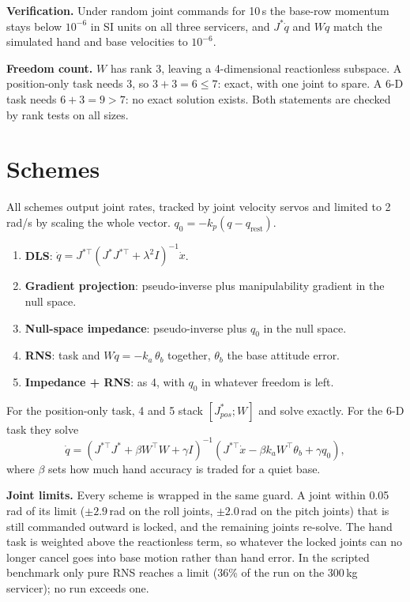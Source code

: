\documentclass[conference]{IEEEtran}
\newcommand{\qd}{\dot{q}}
\begin{document}
\textbf{Verification.} Under random joint commands for 10\,s the base-row momentum stays below
$10^{-6}$ in SI units on all three servicers, and $J^{*}\qd$ and $W\qd$ match the simulated hand
and base velocities to $10^{-6}$.

\textbf{Freedom count.} $W$ has rank 3, leaving a 4-dimensional reactionless subspace. A
position-only task needs 3, so $3+3=6\le7$: exact, with one joint to spare. A 6-D task needs
$6+3=9>7$: no exact solution exists. Both statements are checked by rank tests on all sizes.

\section{Schemes}
All schemes output joint rates, tracked by joint velocity servos and limited to 2\,rad/s by
scaling the whole vector. $q_0=-k_p(q-q_{\mathrm{rest}})$.
\begin{enumerate}
\item \textbf{DLS}: $\qd=J^{*\top}(J^{*}J^{*\top}+\lambda^2I)^{-1}\dot{x}$.
\item \textbf{Gradient projection}: pseudo-inverse plus manipulability gradient in the null space.
\item \textbf{Null-space impedance}: pseudo-inverse plus $q_0$ in the null space.
\item \textbf{RNS}: task and $W\qd=-k_a\,\theta_b$ together, $\theta_b$ the base attitude error.
\item \textbf{Impedance + RNS}: as 4, with $q_0$ in whatever freedom is left.
\end{enumerate}
For the position-only task, 4 and 5 stack $[J^{*}_{pos};W]$ and solve exactly. For the 6-D task
they solve
\begin{equation}
\qd=(J^{*\top}J^{*}+\beta W^{\top}W+\gamma I)^{-1}(J^{*\top}\dot{x}-\beta k_a W^{\top}\theta_b+\gamma q_0),
\end{equation}
where $\beta$ sets how much hand accuracy is traded for a quiet base.

\textbf{Joint limits.} Every scheme is wrapped in the same guard. A joint within 0.05\,rad of its
limit ($\pm2.9$\,rad on the roll joints, $\pm2.0$\,rad on the pitch joints) that is still commanded
outward is locked, and the remaining joints re-solve. The hand task is weighted above the
reactionless term, so whatever the locked joints can no longer cancel goes into base motion
rather than hand error. In the scripted benchmark only pure RNS reaches a limit (36\% of the run
on the 300\,kg servicer); no run exceeds one.
\end{document}
